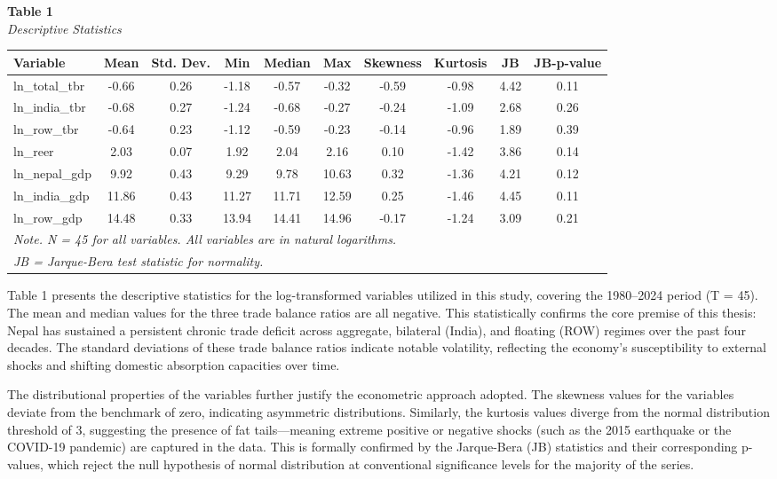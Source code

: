 \documentclass[12pt]{article}
\begin{document}
\begin{table}[htbp]
\raggedright

\textbf{Table 1}\\
\textit{Descriptive Statistics}

\vspace{0.2cm}
\begin{tabular}{lccccccccc}
\hline
\textbf{Variable} & \textbf{Mean} & \textbf{Std. Dev.} & \textbf{Min} & \textbf{Median} & \textbf{Max} & \textbf{Skewness} & \textbf{Kurtosis} & \textbf{JB} & \textbf{JB-p-value} \\
\hline
ln\_total\_tbr & -0.66 & 0.26 & -1.18 & -0.57 & -0.32 & -0.59 & -0.98 & 4.42 & 0.11 \\
ln\_india\_tbr & -0.68 & 0.27 & -1.24 & -0.68 & -0.27 & -0.24 & -1.09 & 2.68 & 0.26 \\
ln\_row\_tbr & -0.64 & 0.23 & -1.12 & -0.59 & -0.23 & -0.14 & -0.96 & 1.89 & 0.39 \\
ln\_reer & 2.03 & 0.07 & 1.92 & 2.04 & 2.16 & 0.10 & -1.42 & 3.86 & 0.14 \\
ln\_nepal\_gdp & 9.92 & 0.43 & 9.29 & 9.78 & 10.63 & 0.32 & -1.36 & 4.21 & 0.12 \\
ln\_india\_gdp & 11.86 & 0.43 & 11.27 & 11.71 & 12.59 & 0.25 & -1.46 & 4.45 & 0.11 \\
ln\_row\_gdp & 14.48 & 0.33 & 13.94 & 14.41 & 14.96 & -0.17 & -1.24 & 3.09 & 0.21 \\
\hline
\multicolumn{10}{l}{\textit{Note. N = 45 for all variables. All variables are in natural logarithms.}} \\
\multicolumn{10}{l}{\textit{JB = Jarque-Bera test statistic for normality.}} \\
\hline
\end{tabular}
\end{table}

Table 1 presents the descriptive statistics for the log-transformed variables utilized in this study, covering the 1980–2024 period (T = 45). The mean and median values for the three trade balance ratios are all negative. This statistically confirms the core premise of this thesis: Nepal has sustained a persistent chronic trade deficit across aggregate, bilateral (India), and floating (ROW) regimes over the past four decades. The standard deviations of these trade balance ratios indicate notable volatility, reflecting the economy's susceptibility to external shocks and shifting domestic absorption capacities over time.

The distributional properties of the variables further justify the econometric approach adopted. The skewness values for the variables deviate from the benchmark of zero, indicating asymmetric distributions. Similarly, the kurtosis values diverge from the normal distribution threshold of 3, suggesting the presence of fat tails—meaning extreme positive or negative shocks (such as the 2015 earthquake or the COVID-19 pandemic) are captured in the data. This is formally confirmed by the Jarque-Bera (JB) statistics and their corresponding p-values, which reject the null hypothesis of normal distribution at conventional significance levels for the majority of the series.
\end{document}
